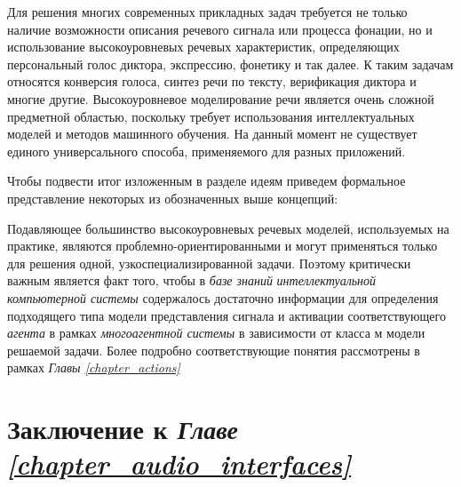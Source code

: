 Для решения многих современных прикладных задач требуется не только наличие возможности описания речевого сигнала или процесса фонации, но и использование высокоуровневых речевых характеристик, определяющих персональный голос диктора, экспрессию, фонетику и так далее. К таким задачам относятся конверсия голоса, синтез речи по тексту, верификация диктора и многие другие. Высокоуровневое моделирование речи является очень сложной предметной областью, поскольку требует использования интеллектуальных моделей и методов машинного обучения. На данный момент не существует единого универсального способа, применяемого для разных приложений.

Чтобы подвести итог изложенным в разделе идеям приведем формальное представление некоторых из обозначенных выше концепций:

\begin{SCn}
\begin{scnindent}
\end{scnindent}
\end{SCn}

Подавляющее большинство высокоуровневых речевых моделей, используемых на практике, являются проблемно-ориентированными и могут применяться только для решения одной, узкоспециализированной задачи. Поэтому критически важным является факт того, чтобы в \textit{базе знаний} \textit{интеллектуальной компьютерной системы} содержалось достаточно информации для определения подходящего типа модели представления сигнала и активации соответствующего \textit{агента} в рамках \textit{многоагентной системы} в зависимости от класса м модели решаемой задачи. Более подробно соответствующие понятия рассмотрены в рамках \textit{Главы \ref{chapter_actions}}


\section*{Заключение к \textit{Главе \ref{chapter_audio_interfaces}~}}

